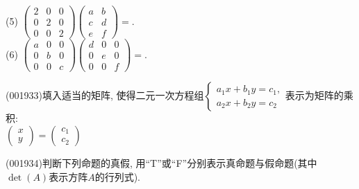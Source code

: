 (5) $\left(\begin{array}{ccc}2&0&0\\0&2&0\\0&0&2\end{array}\right)\left(\begin{array}{cc}a& b\\c & d\\e&f \end{array}\right)=$\underline{}.\\ 
(6) $\left(\begin{array}{ccc}a&0&0\\0&b&0\\0&0&c\end{array}\right)\left(\begin{array}{ccc}d&0&0\\0&e&0\\0&0&f\end{array}\right)=$\underline{}.
\item (001933)填入适当的矩阵, 使得二元一次方程组$\left\{\begin{array}{l}a_1x+b_1y=c_1,\\a_2x+b_2y=c_2\end{array}\right.$表示为矩阵的乘积:\\ 
\underline{}$\left(\begin{array}{c}x\\y\end{array}\right)=\left(\begin{array}{c}c_1\\c_2\end{array}\right)$
\item (001934)判断下列命题的真假, 用``T''或``F''分别表示真命题与假命题(其中$\det(A)$表示方阵$A$的行列式).\\ 
